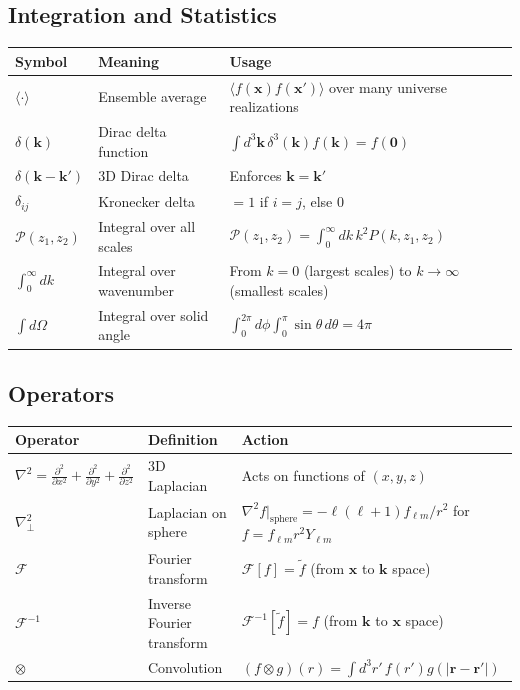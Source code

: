 \subsection{Integration and Statistics}\label{subsec:notation_integration}

\begin{longtable}{l l p{10cm}}
\toprule
\textbf{Symbol} & \textbf{Meaning} & \textbf{Usage} \\
\midrule
\endhead
\bottomrule
\endfoot

$\langle \cdot \rangle$ & Ensemble average & $\langle f(\mathbf{x}) f(\mathbf{x}') \rangle$ over many universe realizations \\
$\delta(\mathbf{k})$ & Dirac delta function & $\int d^3\mathbf{k} \, \delta^3(\mathbf{k}) f(\mathbf{k}) = f(\mathbf{0})$ \\
$\delta(\mathbf{k} - \mathbf{k}')$ & 3D Dirac delta & Enforces $\mathbf{k} = \mathbf{k}'$ \\
$\delta_{ij}$ & Kronecker delta & $= 1$ if $i=j$, else $0$ \\
$\mathcal{P}(z_1, z_2)$ & Integral over all scales & $\mathcal{P}(z_1, z_2) = \int_0^\infty dk \, k^2 P(k, z_1, z_2)$ \\
$\int_0^\infty dk$ & Integral over wavenumber & From $k=0$ (largest scales) to $k \to \infty$ (smallest scales) \\
$\int d\Omega$ & Integral over solid angle & $\int_0^{2\pi} d\phi \int_0^\pi \sin\theta \, d\theta = 4\pi$ \\
\end{longtable}

\subsection{Operators}\label{subsec:notation_operators}

\begin{longtable}{l l p{10cm}}
\toprule
\textbf{Operator} & \textbf{Definition} & \textbf{Action} \\
\midrule
\endhead
\bottomrule
\endfoot

$\nabla^2 = \frac{\partial^2}{\partial x^2} + \frac{\partial^2}{\partial y^2} + \frac{\partial^2}{\partial z^2}$ & 3D Laplacian & Acts on functions of $(x,y,z)$ \\
$\nabla^2_\perp$ & Laplacian on sphere & $\nabla^2 f|_{\mathrm{sphere}} = -\ell(\ell+1) f_{\ell m} / r^2$ for $f = f_{\ell m} r^2 Y_{\ell m}$ \\
$\mathcal{F}$ & Fourier transform & $\mathcal{F}[f] = \tilde{f}$ (from $\mathbf{x}$ to $\mathbf{k}$ space) \\
$\mathcal{F}^{-1}$ & Inverse Fourier transform & $\mathcal{F}^{-1}[\tilde{f}] = f$ (from $\mathbf{k}$ to $\mathbf{x}$ space) \\
$\otimes$ & Convolution & $(f \otimes g)(r) = \int d^3r' \, f(r') g(|\mathbf{r}-\mathbf{r}'|)$ \\
\end{longtable}

